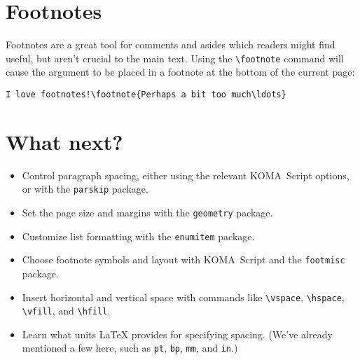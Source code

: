 \section{Footnotes}

Footnotes are a great tool for comments and asides which readers might
find useful, but aren't crucial to the main text.
Using the \verb|\footnote| command will cause the argument to be placed
in a footnote at the bottom of the current page:
\begin{leftfigure}
\begin{lstlisting}
I love footnotes!\footnote{Perhaps a bit too much\ldots}
\end{lstlisting}
\end{leftfigure}

\section{What next?}
\begin{itemize}
\item Control paragraph spacing, either using the relevant
KOMA~Script options, or with the \texttt{parskip} package.
\item Set the page size and margins with the \texttt{geometry} package.
\item Customize list formatting with the \texttt{enumitem} package.
\item Choose footnote symbols and layout with KOMA~Script and the
    \texttt{footmisc} package.
\item Insert horizontal and vertical space with commands like
    \verb|\vspace|, \verb|\hspace|, \verb|\vfill|, and \verb|\hfill|.
\item Learn what units \LaTeX{} provides for specifying spacing.
    (We've already mentioned a few here, such as
    \texttt{pt}, \texttt{bp}, \texttt{mm}, and \texttt{in}.)
\end{itemize}
